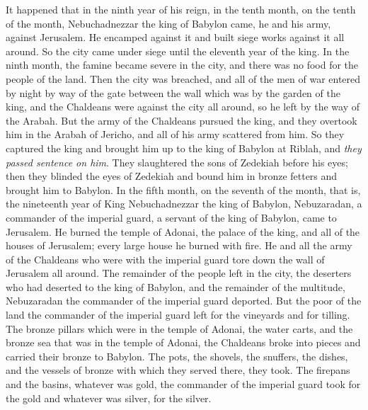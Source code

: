 \begin{biblechapter} %
 It happened that in the ninth year of his reign, in the tenth month, on the tenth of the month, Nebuchadnezzar the king of Babylon came, he and his army, against Jerusalem. He encamped against it and built siege works against it all around.
\verse So the city came under siege until the eleventh year of the king.
\verse In the ninth month, the famine became severe in the city, and there was no food for the people of the land.
\verse Then the city was breached, and all of the men of war entered by night by way of the gate between the wall which was by the garden of the king, and the Chaldeans were against the city all around, so he left by the way of the Arabah.
\verse But the army of the Chaldeans pursued the king, and they overtook him in the Arabah of Jericho, and all of his army scattered from him.
\verse So they captured the king and brought him up to the king of Babylon at Riblah, and \textit{they passed sentence on him}.
\verse They slaughtered the sons of Zedekiah before his eyes; then they blinded the eyes of Zedekiah and bound him in bronze fetters and brought him to Babylon.
 In the fifth month, on the seventh of the month, that is, the nineteenth year of King Nebuchadnezzar the king of Babylon, Nebuzaradan, a commander of the imperial guard, a servant of the king of Babylon, came to Jerusalem.
\verse He burned the temple of Adonai, the palace of the king, and all of the houses of Jerusalem; every large house he burned with fire.
\verse He and all the army of the Chaldeans who were with the imperial guard tore down the wall of Jerusalem all around.
\verse The remainder of the people left in the city, the deserters who had deserted to the king of Babylon, and the remainder of the multitude, Nebuzaradan the commander of the imperial guard deported.
\verse But the poor of the land the commander of the imperial guard left for the vineyards and for tilling.
 The bronze pillars which were in the temple of Adonai, the water carts, and the bronze sea that was in the temple of Adonai, the Chaldeans broke into pieces and carried their bronze to Babylon.
\verse The pots, the shovels, the snuffers, the dishes, and the vessels of bronze with which they served there, they took.
\verse The firepans and the basins, whatever was gold, the commander of the imperial guard took for the gold and whatever was silver, for the silver.

\end{biblechapter}
